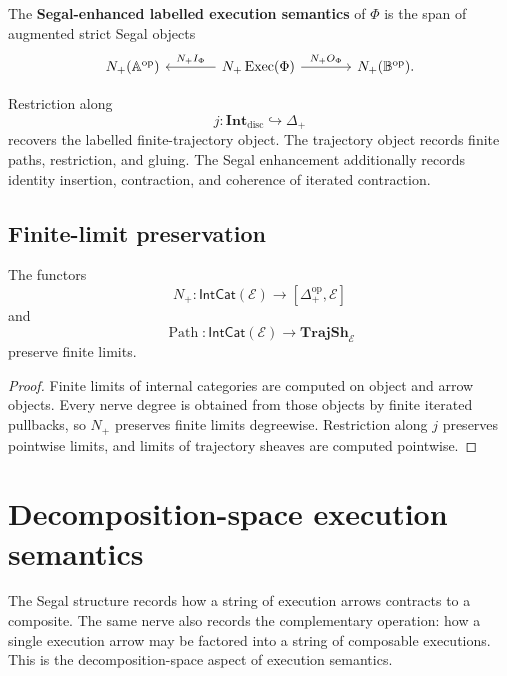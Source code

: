 \begin{definition}
\label{def:segal-enhanced-labelled-execution}
The \textbf{Segal-enhanced labelled execution semantics} of \(\Phi\) is the
span of augmented strict Segal objects
\[
\begin{tikzcd}[column sep=large]
    N_+(\mathbb A^{\mathrm{op}})
    &
    N_+\operatorname{Exec}(\Phi)
        \arrow[l, "N_+I_\Phi"']
        \arrow[r, "N_+O_\Phi"]
    &
    N_+(\mathbb B^{\mathrm{op}}).
\end{tikzcd}
\]
\end{definition}

Restriction along
\[
    j:\mathbf{Int}_{\mathrm{disc}}\hookrightarrow\Delta_+
\]
recovers the labelled finite-trajectory object. The trajectory object records
finite paths, restriction, and gluing. The Segal enhancement additionally
records identity insertion, contraction, and coherence of iterated
contraction.

\subsection{Finite-limit preservation}
\label{subsec:path-nerve-finite-limits}

\begin{proposition}
\label{prop:path-nerve-finite-limit-preservation}
The functors
\[
    N_+:
    \mathsf{IntCat}(\mathcal E)
    \to
    [\Delta_+^{\mathrm{op}},\mathcal E]
\]
and
\[
    \operatorname{Path}:
    \mathsf{IntCat}(\mathcal E)
    \to
    \mathbf{TrajSh}_{\mathcal E}
\]
preserve finite limits.
\end{proposition}

\begin{proof}
Finite limits of internal categories are computed on object and arrow
objects. Every nerve degree is obtained from those objects by finite iterated
pullbacks, so \(N_+\) preserves finite limits degreewise. Restriction along
\(j\) preserves pointwise limits, and limits of trajectory sheaves are
computed pointwise.
\end{proof}

\section{Decomposition-space execution semantics}
\label{sec:decomposition-space-execution}

The Segal structure records how a string of execution arrows contracts to a
composite. The same nerve also records the complementary operation: how a
single execution arrow may be factored into a string of composable
executions. This is the decomposition-space aspect of execution semantics.

